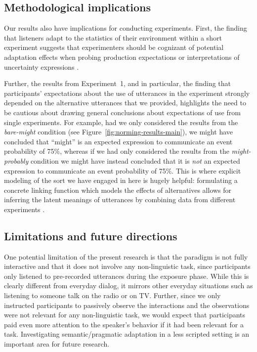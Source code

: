 \documentclass[man, floatsintext]{apa6}
\newcommand{\figref}[1]{Figure~\ref{#1}}
\begin{document}
\subsection{Methodological implications}

Our results also have implications for conducting experiments. First,
the finding that listeners adapt to the statistics of their environment within a short experiment
suggests that experimenters should be cognizant of potential adaptation effects when probing
production expectations or interpretations of uncertainty expressions \parencite[see also][]{Jaeger2010}. 

Further, the results from Experiment~1, and in particular, the finding
that participants' expectations about the use of utterances in the experiment strongly depended on
the alternative utterances that we provided, highlights the need to be cautious about drawing general conclusions about expectations of use from single experiments. For example,
had we only considered the results from the \textit{bare-might} condition (see \figref{fig:norming-results-main}),
we might have concluded that ``might'' is an expected expression to communicate an event probability of 75\%,
whereas if we had only considered the results from the \textit{might-probably} condition we might have instead concluded that it is \emph{not} an expected expression to communicate an event probability of 75\%.
This is where explicit modeling of the sort we have engaged in here is hugely helpful: formulating a concrete linking function which models the effects of 
alternatives allows for inferring the latent meanings of utterances by combining data from different experiments \parencite[see also][for similar approaches]{Franke2014,Peloquin2016}.

\subsection{Limitations and future directions}

One potential limitation of the present research is that the paradigm is not fully interactive and that it does not involve
any non-linguistic task, since participants only listened to pre-recorded utterances during the exposure phase. 
While this is clearly different from everyday dialog, it mirrors other everyday situations such as listening to someone 
talk on the radio or on TV. Further, since we only instructed participants to passively observe the interactions and the observations 
were not relevant for any non-linguistic task, we would expect that participants paid even more attention to the speaker's behavior 
if it had been relevant for a task. Investigating semantic/pragmatic adaptation in a less scripted setting is 
an important area for future research.
\end{document}
